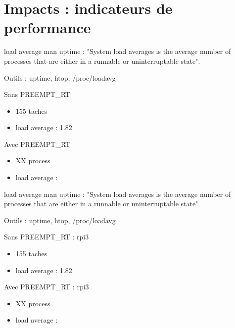 \section{Impacts : indicateurs de performance}
\begin{frame}
	\begin{block}{load average}
man uptime : "System  load  averages  is the average number of processes that are either in a runnable or uninterruptable state".

Outils : uptime, htop, /proc/loadavg
	\end{block}
	\begin{minipage}[t]{0.48\linewidth}
		\begin{block}{Sans PREEMPT\_RT}
			\begin{itemize}
				\item 155 taches
				\item load average : 1.82
			\end{itemize}
		\end{block}
	\end{minipage}
	\begin{minipage}[t]{0.48\linewidth}
		\begin{block}{Avec PREEMPT\_RT}
			\begin{itemize}
				\item XX process
				\item load average : 
			\end{itemize}
		\end{block}
	\end{minipage}
\end{frame}

\begin{frame}
		\begin{block}{load average}
man uptime : "System  load  averages  is the average number of processes that are either in a runnable or uninterruptable state".

Outils : uptime, htop, /proc/loadavg
	\end{block}
	\begin{minipage}[t]{0.48\linewidth}
		\begin{block}{Sans PREEMPT\_RT : rpi3}
			\begin{itemize}
				\item 155 taches
				\item load average : 1.82
			\end{itemize}
		\end{block}
	\end{minipage}
	\begin{minipage}[t]{0.48\linewidth}
		\begin{block}{Avec PREEMPT\_RT : rpi3}
			\begin{itemize}
				\item XX process
				\item load average : 
			\end{itemize}
		\end{block}
	\end{minipage}

\end{frame}
